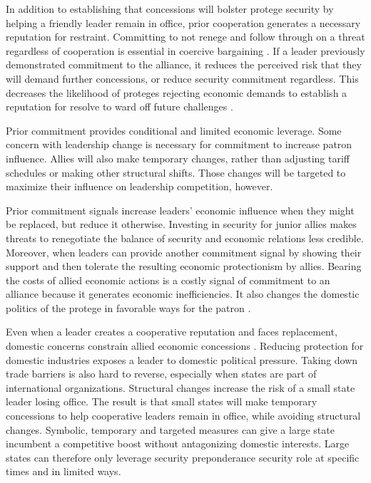 \documentclass[12pt]{article}
\begin{document}
In addition to establishing that concessions will bolster protege security by helping a friendly leader remain in office, prior cooperation generates a necessary reputation for restraint. 
Committing to not renege and follow through on a threat regardless of cooperation is essential in coercive bargaining \citep{Cebuletal2021}. 
If a leader previously demonstrated commitment to the alliance, it reduces the perceived risk that they will demand further concessions, or reduce security commitment regardless.
This decreases the likelihood of proteges rejecting economic demands to establish a reputation for resolve to ward off future challenges \citep{Sechser2010, Sechser2018}. 


Prior commitment provides conditional and limited economic leverage. 
Some concern with leadership change is necessary for commitment to increase patron influence. 
Allies will also make temporary changes, rather than adjusting tariff schedules or making other structural shifts. 
Those changes will be targeted to maximize their influence on leadership competition, however. 


Prior commitment signals increase leaders' economic influence when they might be replaced, but reduce it otherwise. 
Investing in security for junior allies makes threats to renegotiate the balance of security and economic relations less credible. 
Moreover, when leaders can provide another commitment signal by showing their support and then tolerate the resulting economic protectionism by allies. 
Bearing the costs of allied economic actions is a costly signal of commitment to an alliance because it generates economic inefficiencies. 
It also changes the domestic politics of the protege in favorable ways for the patron \citep{Lake2013}. 


Even when a leader creates a cooperative reputation and faces replacement, domestic concerns constrain allied economic concessions \citep{Davis2008}. 
Reducing protection for domestic industries exposes a leader to domestic political pressure. 
Taking down trade barriers is also hard to reverse, especially when states are part of international organizations.
Structural changes increase the risk of a small state leader losing office.  
The result is that small states will make temporary concessions to help cooperative leaders remain in office, while avoiding structural changes. 
Symbolic, temporary and targeted measures can give a large state incumbent a competitive boost without antagonizing domestic interests. 
Large states can therefore only leverage security preponderance security role at specific times and in limited ways.
\end{document}
